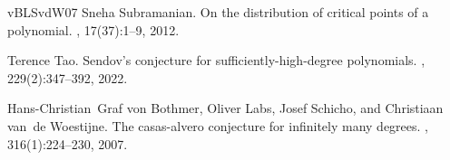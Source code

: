 \documentclass[12pt, reqno]{amsart}
\theoremstyle{plain}
\theoremstyle{definition}
\begin{document}
\begin{thebibliography}{vBLSvdW07}
Sneha Subramanian.
\newblock On the distribution of critical points of a polynomial.
, 17(37):1--9, 2012.

Terence Tao.
\newblock Sendov’s conjecture for sufficiently-high-degree polynomials.
, 229(2):347--392, 2022.

Hans-Christian~Graf von Bothmer, Oliver Labs, Josef Schicho, and Christiaan
  van~de Woestijne.
\newblock The casas-alvero conjecture for infinitely many degrees.
, 316(1):224--230, 2007.

\end{thebibliography}
 
\end{document}
